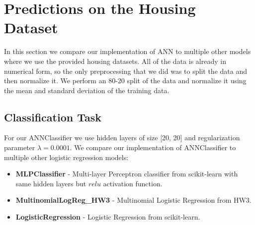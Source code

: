 \documentclass[9pt]{IEEEtran}
\begin{document}
\section{Predictions on the Housing Dataset}
In this section we compare our implementation of ANN to multiple other models where we use the provided housing datasets.
All of the data is already in numerical form, so the only preprocessing that we did was to split the data and then normalize it.
We perform an 80-20 split of the data and normalize it using the mean and standard deviation of the training data.

\subsection{Classification Task}
For our ANNClassifier we use hidden layers of size [20, 20] and regularization parameter $\lambda = 0.0001$.
We compare our implementation of ANNClassifier to multiple other logistic regression models:
\begin{itemize}
    \item \textbf{MLPClassifier} - Multi-layer Perceptron classifier from scikit-learn with same hidden layers but $relu$ activation function.
    \item \textbf{MultinomialLogReg\_HW3} - Multinomial Logistic Regression from HW3.
    \item \textbf{LogisticRegression} - Logistic Regression from scikit-learn.
\end{itemize}
\end{document}

